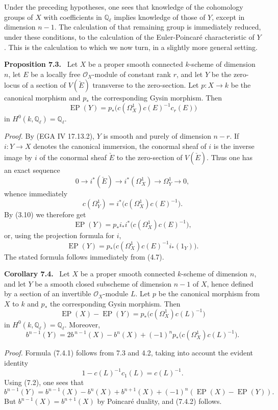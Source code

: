 \documentclass[11pt]{article}
\newenvironment{statement}[1]{\par\medskip\noindent\textbf{#1.}\ }{\par\medskip}
\begin{document}
Under the preceding hypotheses, one sees that knowledge of the cohomology groups of $X$ with coefficients in $\mathbb Q_\ell$ implies knowledge of those of $Y$, except in dimension $n-1$. The calculation of that remaining group is immediately reduced, under these conditions, to the calculation of the Euler-Poincaré characteristic of $Y$. This is the calculation to which we now turn, in a slightly more general setting.

\begin{statement}{Proposition 7.3}
Let $X$ be a proper smooth connected $k$-scheme of dimension $n$, let $E$ be a locally free $\mathcal O_X$-module of constant rank $r$, and let $Y$ be the zero-locus of a section of $V(\check E)$ transverse to the zero-section. Let $p:X\to k$ be the canonical morphism and $p_*$ the corresponding Gysin morphism. Then
\[
\operatorname{EP}(Y)=p_*\bigl(c(\Omega_X^1)c(E)^{-1}c_r(E)\bigr)
\]
in $H^0(k,\mathbb Q_\ell)=\mathbb Q_\ell$.
\end{statement}

\emph{Proof.} By (EGA IV 17.13.2), $Y$ is smooth and purely of dimension $n-r$. If $i:Y\to X$ denotes the canonical immersion, the conormal sheaf of $i$ is the inverse image by $i$ of the conormal sheaf $\check E$ to the zero-section of $V(\check E)$. Thus one has an exact sequence
\[
0\to i^*(\check E)\to i^*(\Omega_X^1)\to\Omega_Y^1\to0,
\tag{7.3.1}
\]
whence immediately
\[
c(\Omega_Y^1)=i^*\bigl(c(\Omega_X^1)c(E)^{-1}\bigr).
\tag{7.3.2}
\]
By (3.10) we therefore get
\[
\operatorname{EP}(Y)=p_*i_*i^*\bigl(c(\Omega_X^1)c(E)^{-1}\bigr),
\]
or, using the projection formula for $i$,
\[
\operatorname{EP}(Y)=p_*\bigl(c(\Omega_X^1)c(E)^{-1}i_*(1_Y)\bigr).
\]
The stated formula follows immediately from (4.7).

\begin{statement}{Corollary 7.4}
Let $X$ be a proper smooth connected $k$-scheme of dimension $n$, and let $Y$ be a smooth closed subscheme of dimension $n-1$ of $X$, hence defined by a section of an invertible $\mathcal O_X$-module $L$. Let $p$ be the canonical morphism from $X$ to $k$ and $p_*$ the corresponding Gysin morphism. Then
\[
\operatorname{EP}(X)-\operatorname{EP}(Y)=p_*\bigl(c(\Omega_X^1)c(L)^{-1}\bigr)
\tag{7.4.1}
\]
in $H^0(k,\mathbb Q_\ell)=\mathbb Q_\ell$. Moreover,
\[
b^{n-1}(Y)=2b^{\,n-1}(X)-b^n(X)+(-1)^n p_*\bigl(c(\Omega_X^1)c(L)^{-1}\bigr).
\tag{7.4.2}
\]
\end{statement}

\emph{Proof.} Formula (7.4.1) follows from 7.3 and 4.2, taking into account the evident identity
\[
1-c(L)^{-1}c_1(L)=c(L)^{-1}.
\]
Using (7.2), one sees that
\[
b^{n-1}(Y)=b^{n-1}(X)-b^n(X)+b^{n+1}(X)+(-1)^n(\operatorname{EP}(X)-\operatorname{EP}(Y)).
\]
But $b^{n-1}(X)=b^{n+1}(X)$ by Poincaré duality, and (7.4.2) follows.
\end{document}

